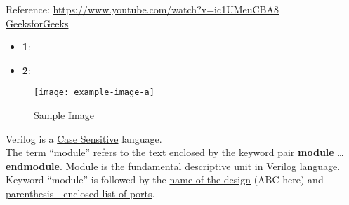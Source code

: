 \documentclass[12pt, a4paper]{article}
\begin{document}
Reference: \url{https://www.youtube.com/watch?v=ic1UMeuCBA8} \\
\href{https://www.geeksforgeeks.org/difference-between-gate-level-and-structural-verilog-hdl/}{GeeksforGeeks}

\begin{itemize}
    \item \textbf{1}: 
    \item \textbf{2}:   
\end{itemize}

\begin{figure}[H]   %
    \centering
    \texttt{[image: example-image-a]} %
    \caption{Sample Image}%
    \label{fig:veri1}
\end{figure}

Verilog is a \underline{Case Sensitive} language. \\
The term ``module'' refers to the text enclosed by the keyword pair \textbf{module} \ldots \textbf{endmodule}. Module is the fundamental descriptive unit in Verilog language. \\
Keyword ``module'' is followed by the \underline{name of the design} (ABC here) and \uline{parenthesis - enclosed list of ports}.\\
\end{document}
